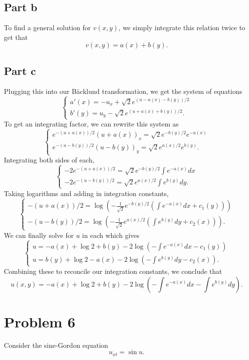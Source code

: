 \documentclass{article}
\begin{document}
\subsection{Part b}
To find a general solution for $v(x,y)$, we simply integrate this relation twice to get that 
\[
v(x,y)=a(x)+b(y).
\]
\subsection{Part c}
Plugging this into our  B\"acklund transformation, we get the system of equations
\[
\begin{cases}
a'(x)=-u_x+\sqrt{2}e^{(u-a(x)-b(y))/2}\\
b'(y)=u_y-\sqrt{2}e^{(u+a(x)+b(y))/2}.
\end{cases}
\]
To get an integrating factor, we can rewrite this system as 
\[
\begin{cases}
	e^{-(u+a(x))/2}(u+a(x))_x=\sqrt{2}e^{-b(y)/2}e^{-a(x)}\\
	e^{-(u-b(y))/2}(u-b(y))_y=\sqrt{2}e^{a(x)/2}e^{b(y)}.
\end{cases}
\]
Integrating both sides of each,
\[
\begin{cases}
	-2e^{-(u+a(x))/2}=\sqrt{2}e^{-b(y)/2}\int e^{-a(x)}dx\\
	-2e^{-(u-b(y))/2}=\sqrt{2}e^{a(x)/2}\int e^{b(y)}dy.
\end{cases}
\]
Taking logarithms and adding in integration constants,
\[
\begin{cases}
	-(u+a(x))/2=\log\left(-\frac{1}{\sqrt{2}}e^{-b(y)/2}\left(\int e^{-a(x)}dx+c_1(y)\right)\right)\\
	-(u-b(y))/2=\log\left(-\frac{1}{\sqrt{2}}e^{a(x)/2}\left(\int e^{b(y)}dy+c_2(x)\right)\right).
\end{cases}
\]
We can finally solve for $u$ in each which gives
\[
\begin{cases}
	u=-a(x)+\log2+b(y)-2\log\left(-\int e^{-a(x)}dx-c_1(y)\right)\\
	u=b(y)+\log2-a(x)-2\log\left(-\int e^{b(y)}dy-c_2(x)\right).
\end{cases}
\]
Combining these to reconcile our integration constants, we conclude that 
\[
u(x,y) = -a(x)+\log2+b(y)-2\log\left(-\int e^{-a(x)}dx-\int e^{b(y)}dy\right).
\]

\section{Problem 6}
Consider the sine-Gordon equation
\[
u_{xt}=\sin u.
\]
\end{document}

